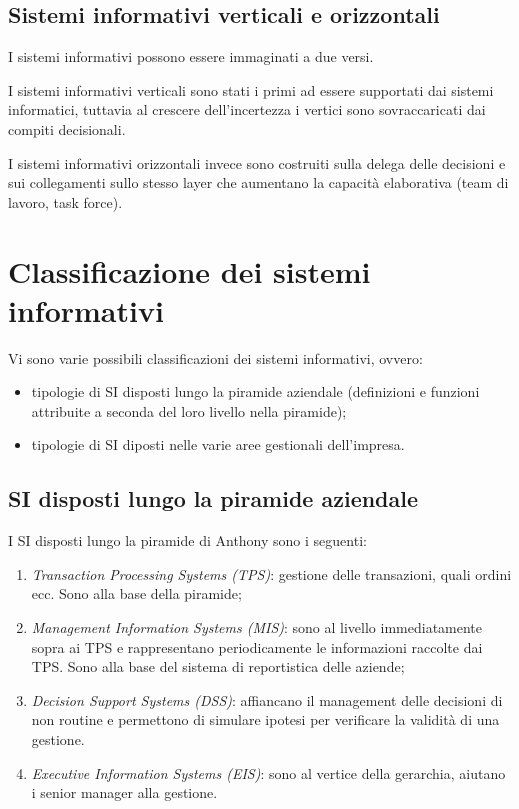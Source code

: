 \documentclass[a4paper, 10pt]{article}
\begin{document}
	\subsection{Sistemi informativi verticali e orizzontali}
	I sistemi informativi possono essere immaginati a due versi. 
	
	I sistemi informativi verticali sono stati i primi ad essere supportati dai sistemi informatici, tuttavia al crescere dell'incertezza i vertici sono sovraccaricati dai compiti decisionali. 
	
	I sistemi informativi orizzontali invece sono costruiti sulla delega delle decisioni e sui collegamenti sullo stesso layer che aumentano la capacità elaborativa (team di lavoro, task force).
	
	\section{Classificazione dei sistemi informativi}
	Vi sono varie possibili classificazioni dei sistemi informativi, ovvero: \begin{itemize}
		\item tipologie di SI disposti lungo la piramide aziendale (definizioni e funzioni attribuite a seconda del loro livello nella piramide);
		\item tipologie di SI diposti nelle varie aree gestionali dell'impresa.
	\end{itemize}

	\subsection{SI disposti lungo la piramide aziendale}
	I SI disposti lungo la piramide di Anthony sono i seguenti:
	\begin{enumerate}
		\item \textit{Transaction Processing Systems (TPS)}: gestione delle transazioni, quali ordini ecc. Sono alla base della piramide;
		
		\item \textit{Management Information Systems (MIS)}: sono al livello immediatamente sopra ai TPS e rappresentano periodicamente le informazioni raccolte dai TPS. Sono alla base del sistema di reportistica delle aziende;
		
		\item \textit{Decision Support Systems (DSS)}: affiancano il management delle decisioni di non routine e permettono di simulare ipotesi per verificare la validità di una gestione.
		
		\item \textit{Executive Information Systems (EIS)}: sono al vertice della gerarchia, aiutano i senior manager alla gestione.
	\end{enumerate}
	
\end{document}
